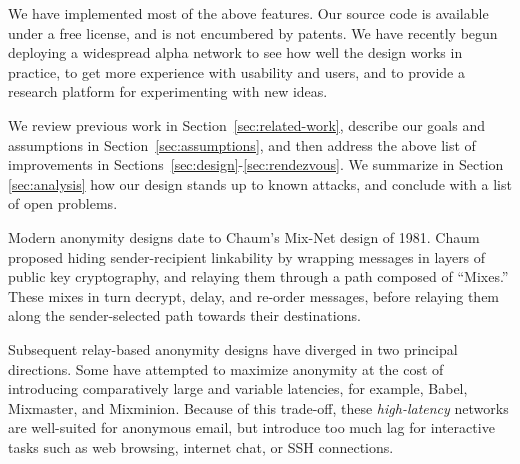 \documentclass[times,10pt,twocolumn]{article}
\begin{document}
We have implemented most of the above features. Our source code is
available under a free license, and is not encumbered by patents. We have
recently begun deploying a widespread alpha network to see how well the
design works in practice, to get more experience with usability and users,
and to provide a research platform for experimenting with new ideas.

We review previous work in Section~\ref{sec:related-work}, describe
our goals and assumptions in Section~\ref{sec:assumptions},
and then address the above list of improvements in
Sections~\ref{sec:design}-\ref{sec:rendezvous}. We
summarize in Section \ref{sec:analysis}
how our design stands up to known attacks, and conclude with a list of
open problems.


\label{sec:related-work}

Modern anonymity designs date to Chaum's Mix-Net\cite{chaum-mix} design of
1981.  Chaum proposed hiding sender-recipient linkability by wrapping
messages in layers of public key cryptography, and relaying them
through a path composed of ``Mixes.''  These mixes in turn decrypt, delay,
and re-order messages, before relaying them along the sender-selected
path towards their destinations.

Subsequent relay-based anonymity designs have diverged in two
principal directions.  Some have attempted to maximize anonymity at
the cost of introducing comparatively large and variable latencies,
for example, Babel\cite{babel}, Mixmaster\cite{mixmaster-spec}, and
Mixminion\cite{minion-design}.  Because of this
trade-off, these \emph{high-latency} networks are well-suited for anonymous
email, but introduce too much lag for interactive tasks such as web browsing,
internet chat, or SSH connections.
\end{document}
